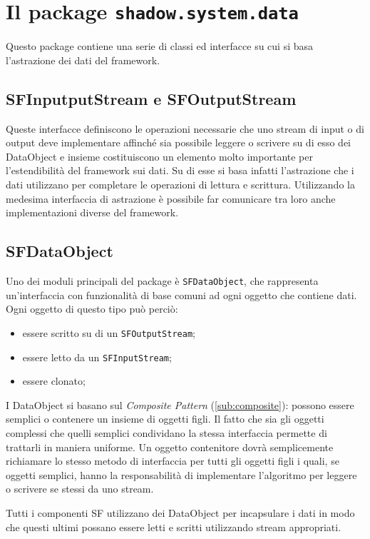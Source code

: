 \section{Il package \texttt{shadow.system.data}}
\label{sec:shadow_system_data}
Questo package contiene una serie di classi ed interfacce su cui si basa l'astrazione dei dati del framework.

\subsection{SFInputputStream e SFOutputStream}
\label{sub:sfinoutstream}
Queste interfacce definiscono le operazioni necessarie che uno stream di input o di output deve implementare affinch\'e sia possibile leggere o scrivere su di esso dei DataObject e insieme costituiscono un elemento molto importante per l'estendibilit\`a del framework sui dati. Su di esse si basa infatti l'astrazione che i dati utilizzano per completare le operazioni di lettura e scrittura. Utilizzando la medesima interfaccia di astrazione \`e possibile far comunicare tra loro anche implementazioni diverse del framework.

\subsection{SFDataObject}
\label{sub:sfdataobject}
Uno dei moduli principali del package \`e \texttt{SFDataObject}, che rappresenta un'interfaccia con funzionalit\`a di base comuni ad ogni oggetto che contiene dati. 
Ogni oggetto di questo tipo pu\`o perci\`o:
\begin{itemize}
	\item essere scritto su di un \texttt{SFOutputStream};
	\item essere letto da un \texttt{SFInputStream};
	\item essere clonato;
\end{itemize}
I DataObject si basano sul \textit{Composite Pattern} (\ref{sub:composite}): possono essere semplici o contenere un insieme di oggetti figli. Il fatto che sia gli oggetti complessi che quelli semplici condividano la stessa interfaccia permette di trattarli in maniera uniforme. Un oggetto contenitore dovr\`a semplicemente richiamare lo stesso metodo di interfaccia per tutti gli oggetti figli i quali, se oggetti semplici, hanno la responsabilit\`a di implementare l'algoritmo per leggere o scrivere se stessi da uno stream.

Tutti i componenti SF utilizzano dei DataObject per incapsulare i dati in modo che questi ultimi possano essere letti e scritti utilizzando stream appropriati.

